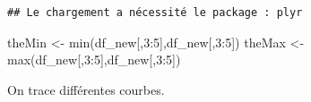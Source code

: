 \documentclass[
]{article}
\newenvironment{Shaded}{\begin{snugshade}}{\end{snugshade}}
\newcommand{\DecValTok}[1]{\textcolor[rgb]{0.00,0.00,0.81}{#1}}
\newcommand{\FunctionTok}[1]{\textcolor[rgb]{0.00,0.00,0.00}{#1}}
\newcommand{\NormalTok}[1]{#1}
\newcommand{\OtherTok}[1]{\textcolor[rgb]{0.56,0.35,0.01}{#1}}
\newcommand{\SpecialCharTok}[1]{\textcolor[rgb]{0.00,0.00,0.00}{#1}}
\begin{document}
\begin{verbatim}
## Le chargement a nécessité le package : plyr
\end{verbatim}

\begin{Shaded}
\begin{Highlighting}[]
\NormalTok{theMin }\OtherTok{\textless{}{-}} \FunctionTok{min}\NormalTok{(df\_new[,}\DecValTok{3}\SpecialCharTok{:}\DecValTok{5}\NormalTok{],df\_new[,}\DecValTok{3}\SpecialCharTok{:}\DecValTok{5}\NormalTok{])}
\NormalTok{theMax }\OtherTok{\textless{}{-}} \FunctionTok{max}\NormalTok{(df\_new[,}\DecValTok{3}\SpecialCharTok{:}\DecValTok{5}\NormalTok{],df\_new[,}\DecValTok{3}\SpecialCharTok{:}\DecValTok{5}\NormalTok{])}
\end{Highlighting}
\end{Shaded}

On trace différentes courbes.
\end{document}
